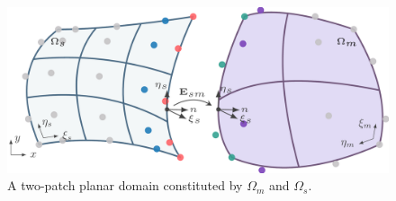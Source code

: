 \documentclass[preprint,12pt]{elsarticle}
\theoremstyle{remark}
\begin{document}
\begin{figure}
    \centering
    \includegraphics[width=\linewidth]{two_planar_patches}
    \caption{A two-patch planar domain constituted by $\Omega_m$ and $\Omega_s$.}\label{fig:two_planar_patches}
\end{figure}
\end{document}
